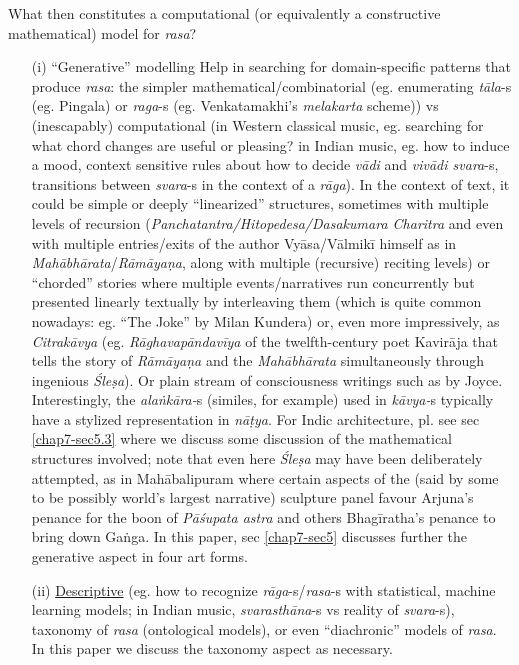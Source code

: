 What then constitutes a computational (or equivalently a constructive mathematical) model for \textsl{rasa}?
\begin{itemize}
\item[(i)] “Generative” modelling Help in searching for domain-specific patterns that produce \textsl{rasa}: the simpler mathematical/combinatorial (eg. enumerating \textsl{tāla}-s (eg. Pingala) or \textsl{raga}-s (eg. Venkatamakhi’s \textsl{melakarta} scheme)) vs (inescapably) computational (in Western classical music, eg. searching for what chord changes are useful or pleasing? in Indian music, eg. how to induce a mood, context sensitive rules about how to decide \textsl{vādi} and \textsl{vivādi svara}-s, transitions between \textsl{svara}-s in the context of a \textsl{rāga}). In the context of text, it could be simple or deeply “linearized” structures, sometimes with multiple levels of recursion (\textsl{Panchatantra/Hitopedesa/Dasakumara Charitra }and even with multiple entries/exits of the author Vyāsa/Vālmikī himself as in \textsl{Mahābhārata}/\textsl{Rāmāyaṇa}, along with multiple (recursive) reciting levels) or “chorded” stories where multiple events/narratives run concurrently but presented linearly textually by interleaving them (which is quite common nowadays: eg. “The Joke” by Milan Kundera) or, even more impressively, as \textsl{Citrakāvya} (eg. \textsl{Rāghavapāndavīya} of the twelfth-century poet Kavirāja that tells the story of \textsl{Rāmāyaṇa} and the \textsl{Mahābhārata} simultaneously through ingenious \textsl{Śleṣa}). Or plain stream of consciousness writings such as by Joyce. Interestingly, the \textsl{alaṅkāra-}s (similes, for example) used in \textsl{kāvya-}s typically have a stylized representation in \textsl{nāṭya}. For Indic architecture, pl. see sec \ref{chap7-sec5.3} where we discuss some discussion of the mathematical structures involved; note that even here \textsl{Śleṣa} may have been deliberately attempted, as in Mahābalipuram where certain aspects of the (said by some to be possibly world's largest narrative) sculpture panel favour Arjuna’s penance for the boon of \textsl{Pāśupata astra} and others Bhagīratha’s penance to bring down Gaṅga. In this paper, sec \ref{chap7-sec5} discusses further the generative aspect in four art forms.

\item[(ii)] \underline{Descriptive} (eg. how to recognize \textsl{rāga}-s/\textsl{rasa}-s with statistical, machine learning models; in Indian music, \textsl{svarasthāna}-s vs reality of \textsl{svara}-s), taxonomy of \textsl{rasa} (ontological models), or even “diachronic” models of \textsl{rasa}. In this paper we discuss the taxonomy aspect as necessary.


\end{itemize}
